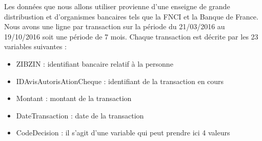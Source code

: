 \documentclass[11pt]{article}
\providecommand{\tightlist}{%
      \setlength{\itemsep}{0pt}\setlength{\parskip}{0pt}}
\begin{document}
    Les données que nous allons utiliser provienne d'une enseigne de grande
distribustion et d'organismes bancaires tels que la FNCI et la Banque de
France. Nous avons une ligne par transaction sur la période du
21/03/2016 au 19/10/2016 soit une période de 7 mois. Chaque transaction
est décrite par les 23 variables suivantes :

\begin{itemize}
\tightlist
\item
  ZIBZIN : identifiant bancaire relatif à la personne
\item
  IDAvisAutorisAtionCheque : identifiant de la transaction en cours
\item
  Montant : montant de la transaction
\item
  DateTransaction : date de la transaction
\item
  CodeDecision : il s'agit d'une variable qui peut prendre ici 4 valeurs


\end{itemize}
\end{document}
